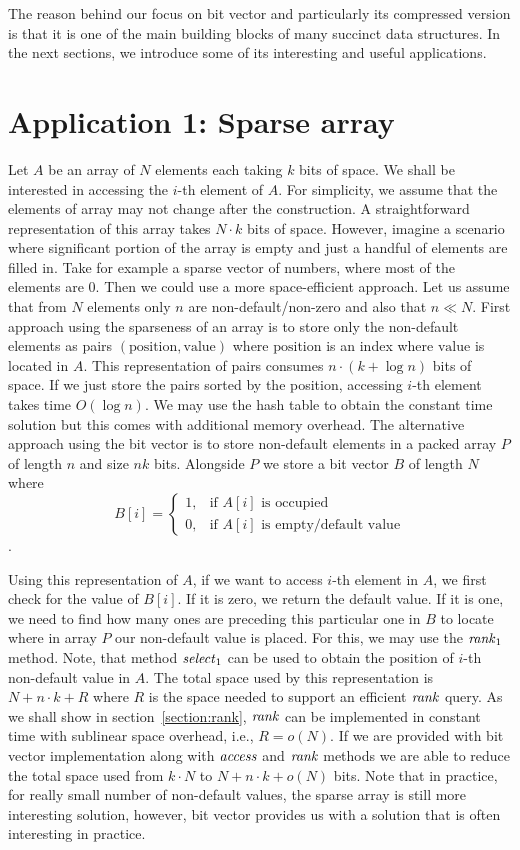 The reason behind our focus on bit vector and particularly its compressed version
is that it is one of the main building blocks of many succinct data structures.
In the next sections, we introduce some of its interesting and useful applications.

\section{Application 1: Sparse array}

Let $A$ be an array of $N$ elements each taking $k$ bits of space. We shall be interested in
accessing the $i$-th element of $A$. For simplicity, we assume that the elements of array may
not change after the construction. A straightforward representation of this array takes $N\cdot k$
bits of space. However, imagine a scenario where significant portion of the array is empty
and just a handful of elements are filled in. Take for example a sparse vector of numbers,
where most of the elements are 0. Then we could use a more space-efficient approach.
Let us assume that from $N$ elements only $n$ are non-default/non-zero and also that $n\ll N$.
First approach using the sparseness of an array is to store only the non-default elements as
pairs $(\text{position}, \text{value})$ where $\text{position}$ is an index where $\text{value}$
is located in $A$. This representation of pairs consumes $n\cdot (k+\log n)$ bits of space.
If we just store the pairs sorted by the position, accessing $i$-th element takes time $O(\log n)$.
We may use the hash table to obtain the constant time solution but this comes with additional
memory overhead. The alternative approach using the bit vector is to store non-default elements in
a packed array $P$ of length $n$ and size $nk$ bits. Alongside $P$ we store a bit vector $B$ of length
$N$ where
\[
   B[i]=
\begin{cases}
   1,& \text{if $A[i]$ is occupied} \\
   0,& \text{if $A[i]$ is empty/default value}
\end{cases}
\].

Using this representation of $A$, if we want to access $i$-th element in $A$, we first check for
the value of $B[i]$. If it is zero, we return the default value. If it is one, we need to find
how many ones are preceding this particular one in $B$ to locate where in array $P$ our non-default
value is placed. For this, we may use the $\mathit{rank}_1$ method. Note, that method $\mathit{select}_1$ can
be used to obtain the position of $i$-th non-default value in $A$. The total space used by this
representation is $N+n\cdot k+R$ where $R$ is the space needed to support an efficient $\mathit{rank}$ query.
As we shall show in section~\ref{section:rank}, $\mathit{rank}$ can be implemented in constant time with
sublinear space overhead, i.e., $R = o(N)$. If we are provided with bit vector implementation along
with $\mathit{access}$ and $\mathit{rank}$ methods we are able to reduce the total space used from $k\cdot N$ to
$N+n\cdot k+o(N)$ bits. Note that in practice, for really small number of non-default values, the
sparse array is still more interesting solution, however, bit vector provides us with a solution that
is often interesting in practice.

